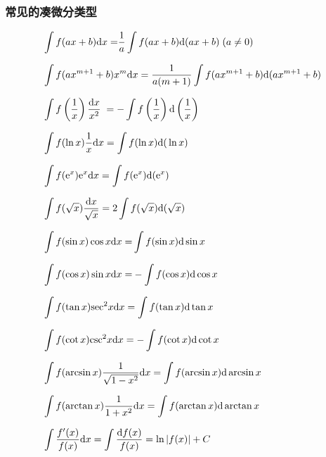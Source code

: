 \documentclass[10pt,a4paper]{article}
\begin{document}
\subsubsection{常见的凑微分类型}
\begin{align}
     & \int {f( ax + b){\rm{d}}x = }\frac{1}{a}\int {f(ax+b){\mathrm{d}}(ax + b)\;(a \neq 0)}                                                              \\[7pt]
     & \int {f(a{x^{m + 1}} + b){x^m}{\rm{d}}x} = \frac{1}{{a(m + 1)}}\int {f(a{x^{m + 1}} + b){\rm{d}}(a{x^{m + 1}} + b)}                                 \\[7pt]
     & \int {f\left( \frac{1}{x}\right) \frac{{{\rm{d}}x}}{{{x^2}}}\;}  =  - \int {f\left( \frac{1}{x}\right) {\rm{d}}\left( \frac{{\rm{1}}}{x}\right) \;} \\[7pt]
     & \int {f(\ln x)\frac{1}{x}} {\rm{d}}x = \int {f(\ln x){\rm{d(}}\ln x)}                                                                               \\[7pt]
     & \int {f({\mathrm{e}^x})} {\mathrm{e}^x}{\rm{d}}x = \int {f({\mathrm{e}^x}} ){\rm{d(}}{\mathrm{e}^x})                                                \\[7pt]
     & \int {f(\sqrt x } )\frac{{{\rm{d}}x}}{{\sqrt x }} = 2\int {f(\sqrt x } ){\rm{d}}(\sqrt x )                                                          \\[7pt]
     & \int {f(\sin x)\cos x{\rm{d}}x = } \int {f(\sin x){\rm{d}}\sin x}                                                                                   \\[7pt]
     & \int {f(\cos x)\sin x{\rm{d}}x = }  - \int {f(\cos x){\rm{d}}\cos x}                                                                                \\[7pt]
     & \int {f(\tan x){{\sec }^2}} x{\rm{d}}x = \int {f(\tan x){\rm{d}}\tan x}                                                                             \\[7pt]
     & \int {f(\cot x){{\csc }^2}} x{\rm{d}}x =  - \int {f(\cot x){\rm{d}}\cot x}                                                                          \\[7pt]
     & \int {f(\arcsin x)\frac{1}{{\sqrt {1 - {x^2}} }}} {\rm{d}}x = \int {f(\arcsin x){\rm{d}}\arcsin x}                                                  \\[7pt]
     & \int {f(\arctan x)\frac{1}{{1 + {x^2}}}} {\rm{d}}x = \int {f(\arctan x){\rm{d}}\arctan x}                                                           \\[7pt]
     & \int {\frac{{f'(x)}}{{f(x)}}} {\rm{d}}x = \int {\frac{{{\rm{d}}f(x)}}{{f(x)}}}  = \ln \left| f(x)\right| + C
\end{align}
\end{document}
